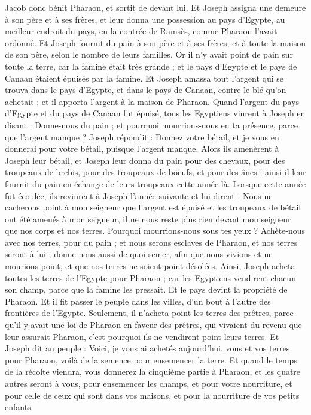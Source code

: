 \begin{multicols}{2}
Jacob donc bénit Pharaon, et sortit de devant lui.
Et Joseph assigna une demeure à son père et à ses frères, et leur donna une possession au pays d'Egypte, au meilleur endroit du pays, en la contrée de Ramsès, comme Pharaon l'avait ordonné.
Et Joseph fournit du pain à son père et à ses frères, et à toute la maison de son père, selon le nombre de leurs familles.
Or il n'y avait point de pain sur toute la terre, car la famine était très grande ; et le pays d'Egypte et le pays de Canaan étaient épuisés par la famine.
Et Joseph amassa tout l'argent qui se trouva dans le pays d'Egypte, et dans le pays de Canaan, contre le blé qu'on achetait ; et il apporta l'argent à la maison de Pharaon.
Quand l'argent du pays d'Egypte et du pays de Canaan fut épuisé, tous les Egyptiens vinrent à Joseph en disant : Donne-nous du pain ; et pourquoi mourrions-nous en ta présence, parce que l'argent manque ?
Joseph répondit : Donnez votre bétail, et je vous en donnerai pour votre bétail, puisque l'argent manque.
Alors ils amenèrent à Joseph leur bétail, et Joseph leur donna du pain pour des chevaux, pour des troupeaux de brebis, pour des troupeaux de boeufs, et pour des ânes ; ainsi il leur fournit du pain en échange de leurs troupeaux cette année-là.
Lorsque cette année fut écoulée, ils revinrent à Joseph l'année suivante et lui dirent : Nous ne cacherons point à mon seigneur que l'argent est épuisé et les troupeaux de bétail ont été amenés à mon seigneur, il ne nous reste plus rien devant mon seigneur que nos corps et nos terres.
Pourquoi mourrions-nous sous tes yeux ? Achète-nous avec nos terres, pour du pain ; et nous serons esclaves de Pharaon, et nos terres seront à lui ; donne-nous aussi de quoi semer, afin que nous vivions et ne mourions point, et que nos terres ne soient point désolées.
Ainsi, Joseph acheta toutes les terres de l'Egypte pour Pharaon ; car les Egyptiens vendirent chacun son champ, parce que la famine les pressait. Et le pays devint la propriété de Pharaon.
Et il fit passer le peuple dans les villes, d'un bout à l'autre des frontières de l'Egypte.
Seulement, il n'acheta point les terres des prêtres, parce qu'il y avait une loi de Pharaon en faveur des prêtres, qui vivaient du revenu que leur assurait Pharaon, c'est pourquoi ils ne vendirent point leurs terres.
Et Joseph dit au peuple : Voici, je vous ai achetés aujourd'hui, vous et vos terres pour Pharaon, voilà de la semence pour ensemencer la terre.
Et quand le temps de la récolte viendra, vous donnerez la cinquième partie à Pharaon, et les quatre autres seront à vous, pour ensemencer les champs, et pour votre nourriture, et pour celle de ceux qui sont dans vos maisons, et pour la nourriture de vos petits enfants.

\end{multicols}
